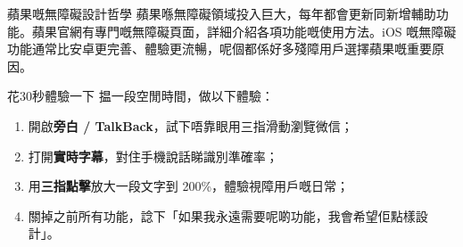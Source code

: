 \begin{tcbinfo}{蘋果嘅無障礙設計哲學}
蘋果喺無障礙領域投入巨大，每年都會更新同新增輔助功能。蘋果官網有專門嘅無障礙頁面，詳細介紹各項功能嘅使用方法。iOS 嘅無障礙功能通常比安卓更完善、體驗更流暢，呢個都係好多殘障用戶選擇蘋果嘅重要原因。

\end{tcbinfo}

\begin{tcbpractice}{花30秒體驗一下}
揾一段空閒時間，做以下體驗：

\begin{enumerate}
  \item 開啟\textbf{旁白 / TalkBack}，試下唔靠眼用三指滑動瀏覽微信；
  \item 打開\textbf{實時字幕}，對住手機說話睇識別準確率；
  \item 用\textbf{三指點擊}放大一段文字到 200\%，體驗視障用戶嘅日常；
  \item 關掉之前所有功能，諗下「如果我永遠需要呢啲功能，我會希望佢點樣設計」。
\end{enumerate}

\end{tcbpractice}
